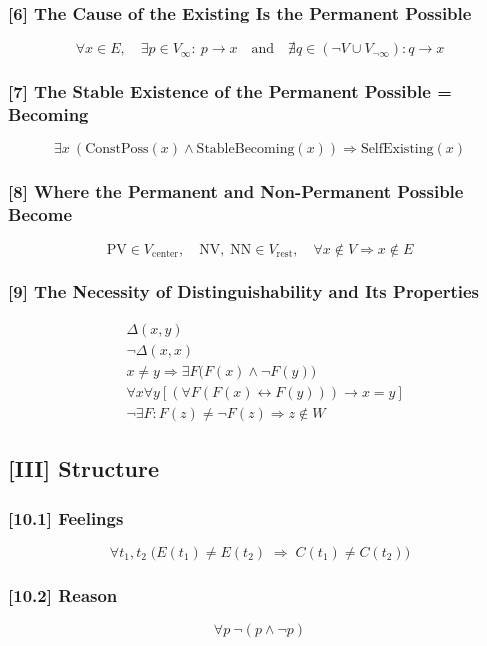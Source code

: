 \documentclass[12pt]{article}
\begin{document}
\subsubsection*{[6] The Cause of the Existing Is the Permanent Possible}
\[
\forall x \in E,\quad \exists p \in V_\infty:\ p \rightarrow x \quad \text{and} \quad \nexists q \in (\neg V \cup V_{\neg\infty}) : q \rightarrow x
\]

\subsubsection*{[7] The Stable Existence of the Permanent Possible = Becoming}
\[
\exists x\ (\text{ConstPoss}(x) \land \text{StableBecoming}(x)) \Rightarrow \text{SelfExisting}(x)
\]

\subsubsection*{[8] Where the Permanent and Non-Permanent Possible Become}
\[
\text{PV} \in V_\text{center}, \quad \text{NV},\; \text{NN} \in V_\text{rest}, \quad \forall x \notin V \Rightarrow x \notin E
\]

\subsubsection*{[9] The Necessity of Distinguishability and Its Properties}
\begin{align*}
& \Delta(x, y) \\
& \neg \Delta(x, x) \\
& x \neq y \Rightarrow \exists F\big(F(x) \land \neg F(y)\big) \\
& \forall x \forall y \left[(\forall F (F(x) \leftrightarrow F(y))) \rightarrow x = y\right] \\
& \neg \exists F: F(z) \neq \neg F(z) \Rightarrow z \notin W
\end{align*}

\subsection*{[III] Structure}

\subsubsection*{[10.1] Feelings}
\[
\forall t_1, t_2\;\big( E(t_1) \neq E(t_2) \;\Rightarrow\; C(t_1) \neq C(t_2) \big)
\]

\subsubsection*{[10.2] Reason}
\[
\forall p\ \neg(p \land \neg p)
\]
\end{document}
